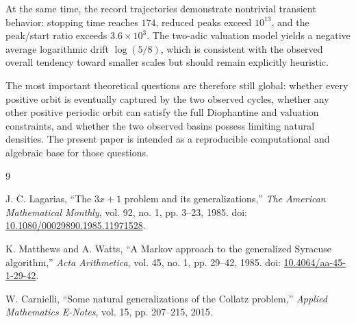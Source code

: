 \documentclass[11pt]{article}
\begin{document}
At the same time, the record trajectories demonstrate nontrivial transient behavior: stopping time reaches \(174\), reduced peaks exceed \(10^{13}\), and the peak/start ratio exceeds \(3.6\times10^3\). The two-adic valuation model yields a negative average logarithmic drift \(\log(5/8)\), which is consistent with the observed overall tendency toward smaller scales but should remain explicitly heuristic.

The most important theoretical questions are therefore still global: whether every positive orbit is eventually captured by the two observed cycles, whether any other positive periodic orbit can satisfy the full Diophantine and valuation constraints, and whether the two observed basins possess limiting natural densities. The present paper is intended as a reproducible computational and algebraic base for those questions.

\begin{thebibliography}{9}

J. C. Lagarias,
``The \(3x+1\) problem and its generalizations,''
\emph{The American Mathematical Monthly}, vol. 92, no. 1, pp. 3--23, 1985.
doi: \href{https://doi.org/10.1080/00029890.1985.11971528}{10.1080/00029890.1985.11971528}.

K. Matthews and A. Watts,
``A Markov approach to the generalized Syracuse algorithm,''
\emph{Acta Arithmetica}, vol. 45, no. 1, pp. 29--42, 1985.
doi: \href{https://doi.org/10.4064/aa-45-1-29-42}{10.4064/aa-45-1-29-42}.

W. Carnielli,
``Some natural generalizations of the Collatz problem,''
\emph{Applied Mathematics E-Notes}, vol. 15, pp. 207--215, 2015.

\end{thebibliography}
\end{document}

